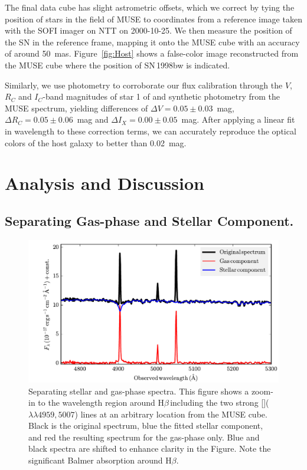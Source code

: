 \documentclass[traditabstract]{aa}
\newcommand{\hb}{H$\beta$}
\newcommand{\oiii}{[\ion{O}{iii}]}
\begin{document}
The final data cube has slight astrometric offsets, which we correct by tying the position of stars in the field of MUSE to coordinates from a reference image taken with the SOFI imager on NTT on 2000-10-25. We then measure the position of the SN in the reference frame, mapping it onto the MUSE cube with an accuracy of around 50~mas. Figure~\ref{fig:Host} shows a false-color image reconstructed from the MUSE cube where the position of SN\,1998bw is indicated.

Similarly, we use photometry to corroborate our flux calibration through the $V$, $R_C$ and $I_C$-band magnitudes of star 1 of \citet{2011AJ....141..163C} and synthetic photometry from the MUSE spectrum, yielding differences of $\Delta V = 0.05\pm0.03$~mag, $\Delta R_C = 0.05\pm0.06$~mag and $\Delta I_X = 0.00\pm0.05$~mag. After applying a linear fit in wavelength to these correction terms, we can accurately reproduce the optical colors of the host galaxy \citep{2005NewA...11..103S} to better than 0.02~mag.


\section{Analysis and Discussion}

\subsection{Separating Gas-phase and Stellar Component.}

\begin{figure}
\includegraphics[angle=0, width=0.99\columnwidth]{Figs/Stargas_spec.pdf}
\caption{Separating stellar and gas-phase spectra. This figure shows a zoom-in to the wavelength region around \hb\,including the two strong \oiii($\lambda\lambda4959,5007$) lines at an arbitrary location from the MUSE cube. Black is the original spectrum, blue the fitted stellar component, and red the resulting spectrum for the gas-phase only. Blue and black spectra are shifted to enhance clarity in the Figure. Note the significant Balmer absorption around \hb.}
\label{fig:stargas}
\end{figure}
\end{document}
